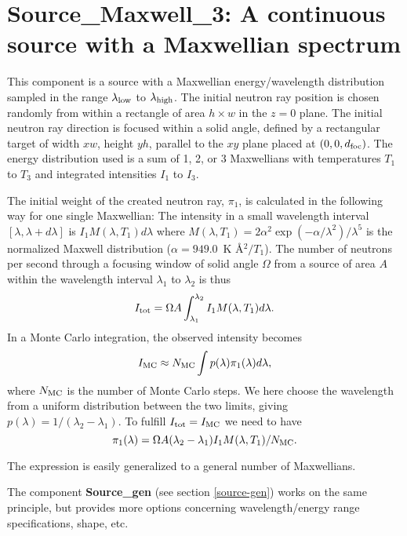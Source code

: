\section{Source\_Maxwell\_3: A continuous source
with a Maxwellian spectrum}
\label{source-maxwell}


This component is a source with a Maxwellian energy/wavelength distribution
sampled in the range $\lambda_{\rm low}$ to $\lambda_{\rm high}$.
The initial neutron ray position is chosen randomly from within a
rectangle of area $h \times w$ in the $z=0$ plane.
The initial neutron ray direction is focused within
a solid angle, defined by a rectangular target of width
$xw$, height $yh$, parallel to
the $xy$ plane placed at $(0,0,d_{\rm foc})$.
The energy distribution used is a sum of 1, 2, or 3 Maxwellians with
temperatures $T_1$ to $T_3$ and integrated intensities $I_1$ to $I_3$.

The initial weight of the created neutron ray, $\pi_1$, is
calculated in the following way for one single Maxwellian:
The intensity in a small wavelength interval $[\lambda, \lambda+d\lambda]$ is
$ I_1 M(\lambda,T_1) d\lambda $
where
$M(\lambda,T_1) = 2 \alpha^2 \exp(-\alpha/\lambda^2) / \lambda^5 $
is the normalized Maxwell distribution ($\alpha=949.0$~K \AA$^2/T_1$).
The number of neutrons per second through a focusing window
of solid angle $\Omega$
from a source of area $A$ within the wavelength interval $\lambda_1$ to
$\lambda_2$ is thus
\begin{equation}
I_{\rm tot} = \Omega A \int_{\lambda_1}^{\lambda_2} I_1 M(\lambda,T_1) d\lambda.
\end{equation}
In a Monte Carlo integration, the observed intensity becomes
\begin{equation}
I_{\rm MC} \approx N_{\rm MC} \int p(\lambda) \pi_1(\lambda) d\lambda ,
\end{equation}
where $N_{\rm MC}$ is the number of Monte Carlo steps.
We here choose the wavelength from a uniform distribution between the two
limits, giving $p(\lambda)=1/(\lambda_2-\lambda_1)$.
To fulfill $I_{\rm tot} = I_{\rm MC}$ we need to have
\begin{equation}
\pi_1(\lambda) = \Omega A (\lambda_2-\lambda_1) I_1 M(\lambda,T_1) / N_{\rm MC} .
\end{equation}

The expression is easily generalized to a general number of Maxwellians.

The component {\bf Source\_gen} (see section \ref{source-gen})
works on the same principle, but provides more options concerning
wavelength/energy range specifications, shape, etc.

